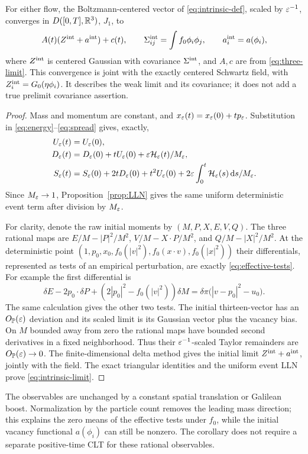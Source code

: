 \begin{corollary}\label{cor:intrinsic}
For either flow, the Boltzmann-centered vector of
\eqref{eq:intrinsic-def}, scaled by $\varepsilon^{-1}$, converges in
$D([0,T],\mathbb R^3)$, $J_1$, to
\begin{equation}\label{eq:intrinsic-limit}
 A(t)(Z^{\rm int}+a^{\rm int})+c(t),
 \qquad
 \Sigma^{\rm int}_{ij}=\int f_0\phi_i\phi_j,\qquad
 a_i^{\rm int}=a(\phi_i),
\end{equation}
where $Z^{\rm int}$ is centered Gaussian with covariance
$\Sigma^{\rm int}$, and $A,c$ are from \eqref{eq:three-limit}.
This convergence is joint with the exactly centered Schwartz field, with
$Z_i^{\rm int}=G_0(\eta\phi_i)$. It describes the weak limit and its
covariance; it does not add a true prelimit covariance assertion.
\end{corollary}
\begin{proof}
Mass and momentum are constant, and
$x_\varepsilon(t)=x_\varepsilon(0)+tp_\varepsilon$.
Substitution in \eqref{eq:energy}--\eqref{eq:spread} gives, exactly,
\begin{align*}
 U_\varepsilon(t)&=U_\varepsilon(0),\\
 D_\varepsilon(t)&=D_\varepsilon(0)+tU_\varepsilon(0)+\varepsilon\mathcal H_\varepsilon(t)/M_\varepsilon,\\
 S_\varepsilon(t)&=S_\varepsilon(0)+2tD_\varepsilon(0)+t^2U_\varepsilon(0)
                         +2\varepsilon\int_0^t\mathcal H_\varepsilon(s)\,\mathrm d s/M_\varepsilon.
\end{align*}
Since $M_\varepsilon\to1$, Proposition~\ref{prop:LLN} gives the same uniform
deterministic event term after division by $M_\varepsilon$.

For clarity, denote the raw initial moments by
$(M,P,X,E,V,Q)$. The three rational maps are
$E/M-|P|^2/M^2$, $V/M-X\cdot P/M^2$, and
$Q/M-|X|^2/M^2$. At the deterministic point
$(1,p_0,x_0,f_0(|v|^2),f_0(x\cdot v),f_0(|x|^2))$
their differentials, represented as tests of an empirical perturbation, are
exactly \eqref{eq:effective-tests}. For example the first differential is
\[
 \delta E-2p_0\cdot\delta P
       +(2|p_0|^2-f_0(|v|^2))\delta M
 =\delta\pi\bigl(|v-p_0|^2-u_0\bigr).
\]
The same calculation gives the other two tests. The initial thirteen-vector
has an $O_{\mathbb P}(\varepsilon)$ deviation and its scaled limit is its Gaussian
vector plus the vacancy bias. On $M$ bounded away from zero the rational
maps have bounded second derivatives in a fixed neighborhood. Thus their
$\varepsilon^{-1}$-scaled Taylor remainders are $O_{\mathbb P}(\varepsilon)\to0$.
The finite-dimensional delta method gives the initial limit
$Z^{\rm int}+a^{\rm int}$, jointly with the field. The exact triangular
identities and the uniform event LLN prove \eqref{eq:intrinsic-limit}.
\end{proof}

The observables are unchanged by a constant spatial translation or Galilean
boost. Normalization by the particle count removes the leading mass direction;
this explains the zero means of the effective tests under $f_0$, while the
initial vacancy functional $a(\phi_i)$ can still be nonzero. The corollary
does not require a separate positive-time CLT for these rational observables.
